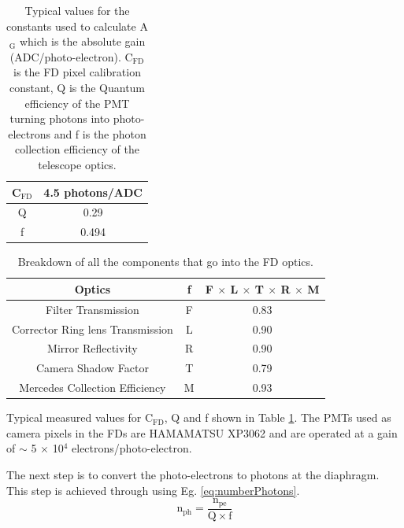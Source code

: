 \vspace{3mm}
\begin{table}[h]
\begin{center}
\begin{tabular}{|c|c|}
\hline 
C$_{\mathrm{FD}}$ & 4.5 photons/ADC \\
\hline
Q & 0.29 \\
\hline
f & 0.494 \\
\hline
\end{tabular} 
\end{center}
\caption{Typical values for the constants used to calculate A$_{\mathrm{G}}$ which is the absolute gain (ADC/photo-electron). $\mathrm{C}_{\mathrm{FD}}$ is the FD pixel calibration constant, Q is the Quantum efficiency of the PMT turning photons into photo-electrons and f is the photon collection efficiency of the telescope optics.} \label{tab:CFD_Q_F}
\end{table} 

\begin{table}[h]
\centering
\begin{tabular}{|c|c|c|}
\hline
Optics & f & F $\times$ L $\times$ T $\times$ R $\times$ M \\ \hline
Filter Transmission & F & 0.83 \\ \hline
Corrector Ring lens Transmission & L & 0.90 \\ \hline
Mirror Reflectivity & R & 0.90 \\ \hline
Camera Shadow Factor & T & 0.79 \\ \hline
Mercedes Collection Efficiency & M & 0.93 \\ \hline
\end{tabular}
\caption{Breakdown of all the components that go into the FD optics.}\label{tab:OpticsBreakdown}
\end{table}

Typical measured values for C$_{\mathrm{FD}}$, Q and f shown in Table \ref{tab:CFD_Q_F}. The PMTs used as camera pixels in the FDs are HAMAMATSU XP3062 and are operated at a gain of $\sim$ 5 $\times$ 10$^4$ electrons/photo-electron.

The next step is to convert the photo-electrons to photons at the diaphragm. This step is achieved through using Eg. \ref{eq:numberPhotons}.
\begin{equation}
\mathrm{n}_{\mathrm{ph}} = \frac{\mathrm{n}_{\mathrm{pe}}}{\mathrm{Q} \times \mathrm{f}} \label{eq:numberPhotons}
\end{equation}

